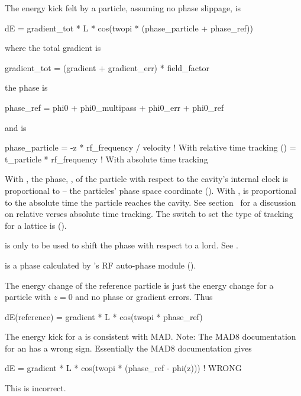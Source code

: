 The energy kick felt by a particle, assuming no phase slippage, is 
\begin{example}
  dE = gradient_tot * L * cos(twopi * (phase_particle + phase_ref))
\end{example}
where the total gradient is
\begin{example}
  gradient_tot = (gradient + gradient_err) * field_factor
\end{example}
the phase  is
\begin{example}
  phase_ref = phi0 + phi0_multipass + phi0_err + phi0_ref
\end{example}
and  is
\begin{example}
  phase_particle = -z * rf_frequency / velocity  ! With relative time tracking ()
                 =  t_particle * rf_frequency    ! With absolute time tracking
\end{example}
With , the phase, , of the
particle with respect to the cavity's internal clock is proportional
to  -- the particles' phase space coordinate
(). With ,
 is proportional to the absolute time the particle
reaches the cavity. See section~ for a discussion on
relative verses absolute time tracking. The switch to set the type of
tracking for a lattice is 
().

 is only to be used to shift the phase with respect to a
 lord. See .

 is a phase calculated by \bmad's RF auto-phase module
().

The energy change of the reference particle is just the energy change for a 
particle with $z = 0$ and no phase or gradient errors. Thus
\begin{example}
  dE(reference) = gradient * L * cos(twopi * phase_ref)
\end{example}

The energy kick for a \bmad {} is consistent with MAD. 
Note: The MAD8 documentation for an  has a wrong
sign. Essentially the MAD8 documentation gives
\begin{example}
  dE = gradient * L * cos(twopi * (phase_ref - phi(z))) ! WRONG
\end{example}
This is incorrect. 

